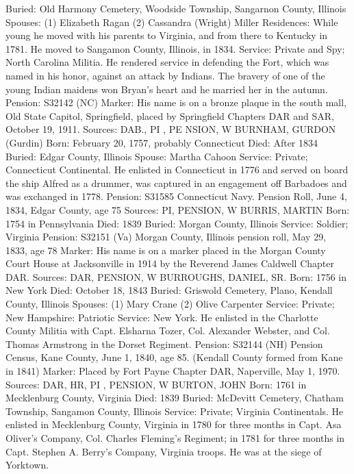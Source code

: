 Buried: Old Harmony Cemetery, Woodside Township, Sangarnon County, Illinois 
Spouses: (1) Elizabeth Ragan 
    (2) Cassandra (Wright) Miller 
Residences: While young he moved with his parents to Virginia, and from there to Kentucky in 1781. He moved to Sangamon County, Illinois, in 1834. 
Service: Private and Spy; North Carolina Militia. He rendered service in defend­ing the Fort, which was named in his honor, against an attack by Indians. The bravery of one of the young Indian maidens won Bryan's heart and he married her in the autumn. 
Pension: S32142 (NC) Marker: His name is on a bronze plaque in the south mall, Old State Capitol, Springfield, placed by Springfield Chapters DAR and SAR, October 19, 1911. 
Sources: DAB., PI , PE NSION, W 
BURNHAM, GURDON (Gurdin) 
Born: February 20, 1757, probably Connecticut 
Died: After 1834 
Buried: Edgar County, Illinois 
Spouse: Martha Cahoon 
Service: Private; Connecticut Continental. He enlisted in Connecticut in 1776 and served on board the ship Alfred as a drummer, was captured in an engage­ment off Barbadoes and was exchanged in 1778. 
Pension: S31585 Connecticut Navy. Pension Roll, June 4, 1834, Edgar County, age 75 
Sources: PI, PENSION, W 
BURRIS, MARTIN 
Born: 1754 in Pennsylvania 
Died: 1839 
Buried: Morgan County, Illinois 
Service: Soldier; Virginia Pension: S32151 (Va) Morgan County, Illinois pension roll, May 29, 1833, age 78 
Marker: His name is on a marker placed in the Morgan County Court House at Jacksonville in 1914 by the Reverend James Caldwell Chapter DAR. 
Sources: DAR, PENSION, W 
BURROUGHS, DANIEL, SR. 
Born: 1756 in New York 
Died: October 18, 1843 
Buried: Griswold Cemetery, Plano, Kendall County, Illinois 
Spouses: (1) Mary Crane 
    (2) Olive Carpenter 
Service: Private; New Hampshire: Patriotic Service: New York. He enlisted in the Charlotte County Militia with Capt. Elsharna Tozer, Col. Alexander Webster, and Col. Thomas Armstrong in the Dorset Regiment.
Pension: S32144 (NH) Pension Census, Kane County, June 1, 1840, age 85. (Ken­dall County formed from Kane in 1841) 
Marker: Placed by Fort Payne Chapter DAR, Naperville, May 1, 1970. 
Sources: DAR, HR, PI , PENSION, W 
BURTON, JOHN 
Born: 1761 in Mecklenburg County, Virginia 
Died: 1839 
Buried: McDevitt Cemetery, Chatham Township, Sangamon County, Illinois 
Service: Private; Virginia Continentals. He enlisted in Mecklenburg County, Virginia in 1780 for three months in Capt. Asa Oliver's Company, Col. Char­les Fleming's Regiment; in 1781 for three months in Capt. Stephen A. Berry's Company, Virginia troops. He was at the siege of Yorktown. 
